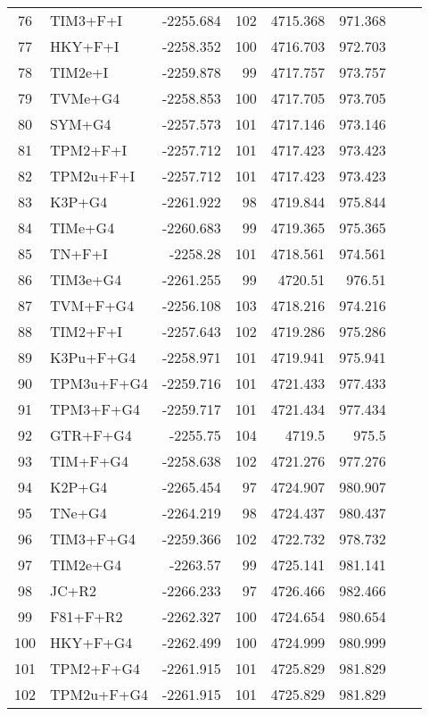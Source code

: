 \begin{longtable}{clrrrrrr}
	76 & TIM3+F+I & -2255.684 & 102 & 4715.368 & 971.368 \\ 
	77 & HKY+F+I & -2258.352 & 100 & 4716.703 & 972.703 \\ 
	78 & TIM2e+I & -2259.878 & 99 & 4717.757 & 973.757 \\ 
	79 & TVMe+G4 & -2258.853 & 100 & 4717.705 & 973.705 \\ 
	80 & SYM+G4 & -2257.573 & 101 & 4717.146 & 973.146 \\ 
	81 & TPM2+F+I & -2257.712 & 101 & 4717.423 & 973.423 \\ 
	82 & TPM2u+F+I & -2257.712 & 101 & 4717.423 & 973.423 \\ 
	83 & K3P+G4 & -2261.922 & 98 & 4719.844 & 975.844 \\ 
	84 & TIMe+G4 & -2260.683 & 99 & 4719.365 & 975.365 \\ 
	85 & TN+F+I & -2258.28 & 101 & 4718.561 & 974.561 \\ 
	86 & TIM3e+G4 & -2261.255 & 99 & 4720.51 & 976.51 \\ 
	87 & TVM+F+G4 & -2256.108 & 103 & 4718.216 & 974.216 \\ 
	88 & TIM2+F+I & -2257.643 & 102 & 4719.286 & 975.286 \\ 
	89 & K3Pu+F+G4 & -2258.971 & 101 & 4719.941 & 975.941 \\ 
	90 & TPM3u+F+G4 & -2259.716 & 101 & 4721.433 & 977.433 \\ 
	91 & TPM3+F+G4 & -2259.717 & 101 & 4721.434 & 977.434 \\ 
	92 & GTR+F+G4 & -2255.75 & 104 & 4719.5 & 975.5 \\ 
	93 & TIM+F+G4 & -2258.638 & 102 & 4721.276 & 977.276 \\ 
	94 & K2P+G4 & -2265.454 & 97 & 4724.907 & 980.907 \\ 
	95 & TNe+G4 & -2264.219 & 98 & 4724.437 & 980.437 \\ 
	96 & TIM3+F+G4 & -2259.366 & 102 & 4722.732 & 978.732 \\ 
	97 & TIM2e+G4 & -2263.57 & 99 & 4725.141 & 981.141 \\ 
	98 & JC+R2 & -2266.233 & 97 & 4726.466 & 982.466 \\ 
	99 & F81+F+R2 & -2262.327 & 100 & 4724.654 & 980.654 \\ 
	100 & HKY+F+G4 & -2262.499 & 100 & 4724.999 & 980.999 \\ 
	101 & TPM2+F+G4 & -2261.915 & 101 & 4725.829 & 981.829 \\ 
	102 & TPM2u+F+G4 & -2261.915 & 101 & 4725.829 & 981.829 \\ 

\end{longtable}
